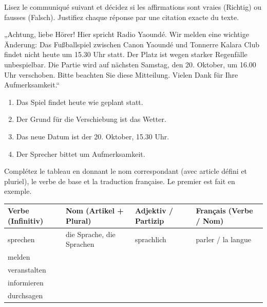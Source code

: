 \documentclass[11pt]{article}
\begin{document}
\begin{exercice}
Lisez le communiqué suivant et décidez si les affirmations sont vraies (Richtig) ou fausses (Falsch). Justifiez chaque réponse par une citation exacte du texte.
\begin{textebox}
„Achtung, liebe Hörer! Hier spricht Radio Yaoundé. Wir melden eine wichtige Änderung: Das Fußballspiel zwischen Canon Yaoundé und Tonnerre Kalara Club findet nicht heute um 15.30 Uhr statt. Der Platz ist wegen starker Regenfälle unbespielbar. Die Partie wird auf nächsten Samstag, den 20. Oktober, um 16.00 Uhr verschoben. Bitte beachten Sie diese Mitteilung. Vielen Dank für Ihre Aufmerksamkeit.“
\end{textebox}
\begin{enumerate}
\item Das Spiel findet heute wie geplant statt.
\item Der Grund für die Verschiebung ist das Wetter.
\item Das neue Datum ist der 20. Oktober, 15.30 Uhr.
\item Der Sprecher bittet um Aufmerksamkeit.
\end{enumerate}
\end{exercice}

\begin{exercice}
Complétez le tableau en donnant le nom correspondant (avec article défini et pluriel), le verbe de base et la traduction française. Le premier est fait en exemple.
\begin{center}
\begin{tabularx}{\linewidth}{|X|X|X|X|}
\hline
\rowcolor{popblueL} \textbf{Verbe (Infinitiv)} & \textbf{Nom (Artikel + Plural)} & \textbf{Adjektiv / Partizip} & \textbf{Français (Verbe / Nom)} \\ \hline
sprechen & die Sprache, die Sprachen & sprachlich & parler / la langue \\ \hline
melden &  &  &  \\ \hline
veranstalten &  &  &  \\ \hline
informieren &  &  &  \\ \hline
durchsagen &  &  &  \\ \hline
\end{tabularx}
\end{center}
\end{exercice}
\end{document}
